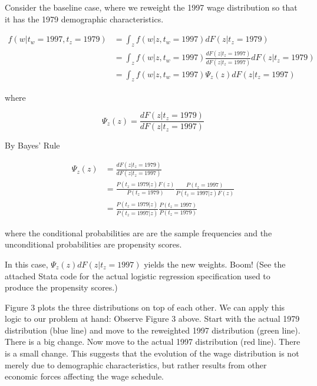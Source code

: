 \documentclass[11pt]{article}
\begin{document}

\bigskip Consider the baseline case, where we reweight the 1997 wage distribution so that it has the 1979 demographic characteristics.

\begin{align*}
f(w|t_w=1997,t_z=1979)&=\int_{z} f(w|z,t_w=1997)dF(z|t_z=1979) \\
&=\int_{z} f(w|z,t_w=1997)\frac{dF(z|t_z=1997)}{dF(z|t_z=1997)}dF(z|t_z=1979) \\
&=\int_{z} f(w|z,t_w=1997)\Psi_z(z)dF(z|t_z=1997)
\end{align*}

where

$$ \Psi_z(z) = \frac{dF(z|t_z=1979)}{dF(z|t_z=1997)} $$

By Bayes' Rule

\begin{align*}
\Psi_z(z) &=\frac{dF(z|t_z=1979)}{dF(z|t_z=1997)} \\
&=\frac{P(t_z=1979|z)F(z)}{P(t_z=1979)}\frac{P(t_z=1997)}{P(t_z=1997|z)F(z)} \\
&= \frac{P(t_z=1979|z)}{P(t_z=1997|z)}\frac{P(t_z=1997)}{P(t_z=1979)}
\end{align*}

where the conditional probabilities are are the sample frequencies and the unconditional probabilities are propensity scores.

\bigskip In this case, $\Psi_z(z)dF(z|t_z=1997)$ yields the new weights. Boom! (See the attached Stata code for the actual logistic regression specification used to produce the propensity scores.)

\bigskip Figure 3 plots the three distributions on top of each other. We can apply this logic to our problem at hand: Observe Figure 3 above. Start with the actual 1979 distribution (blue line) and move to the reweighted 1997 distribution (green line). There is a big change. Now move to the actual 1997 distribution (red line). There is a small change. This suggests that the evolution of the wage distribution is not merely due to demographic characteristics, but rather results from other economic forces affecting the wage schedule.
\end{document}
